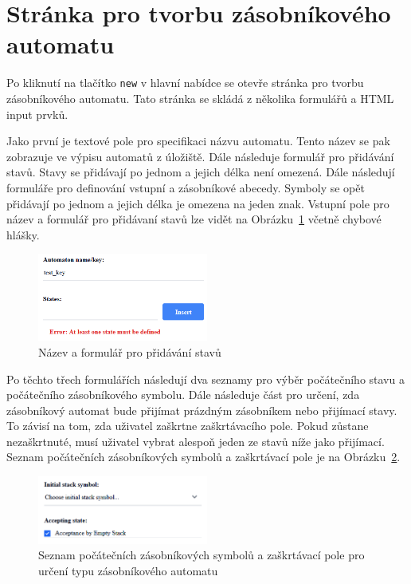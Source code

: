 \section{Stránka pro tvorbu zásobníkového automatu}\label{sec:PDABuilder}

Po kliknutí na tlačítko \texttt{new} v hlavní nabídce se otevře stránka pro tvorbu zásobníkového automatu. Tato stránka se skládá z několika formulářů a HTML input prvků. 

Jako první je textové pole pro specifikaci názvu automatu. Tento název se pak zobrazuje ve výpisu automatů z úložiště. Dále následuje formulář pro přidávání stavů. Stavy se přidávají po jednom a jejich délka není omezená. Dále následují formuláře pro definování vstupní a zásobníkové abecedy. Symboly se opět přidávají po jednom a jejich délka je omezena na jeden znak. Vstupní pole pro název a formulář pro přidávaní stavů lze vidět na Obrázku~\ref{fig:BuilderPart1} včetně chybové hlášky.

\begin{figure}[h]
    \centering
    \includegraphics[width=0.5\textwidth]{Figures/PrntScrn_UI_BuilderPart1.png}
    \caption{Název a formulář pro přidávání stavů}\label{fig:BuilderPart1}
\end{figure}

Po těchto třech formulářích následují dva seznamy pro výběr počátečního stavu a počátečního zásobníkového symbolu. Dále následuje část pro určení, zda zásobníkový automat bude přijímat prázdným zásobníkem nebo přijímací stavy. To závisí na tom, zda uživatel zaškrtne zaškrtávacího pole. Pokud zůstane nezaškrtnuté, musí uživatel vybrat alespoň jeden ze stavů níže jako přijímací. Seznam počátečních zásobníkových symbolů a zaškrtávací pole je na Obrázku~\ref{fig:BuilderPart2}.

\begin{figure}[h]
    \centering
    \includegraphics[width=0.5\textwidth]{Figures/PrntScrn_UI_BuilderPart2.png}
    \caption{Seznam počátečních zásobníkových symbolů a zaškrtávací pole pro určení typu zásobníkového automatu}\label{fig:BuilderPart2}
\end{figure}

